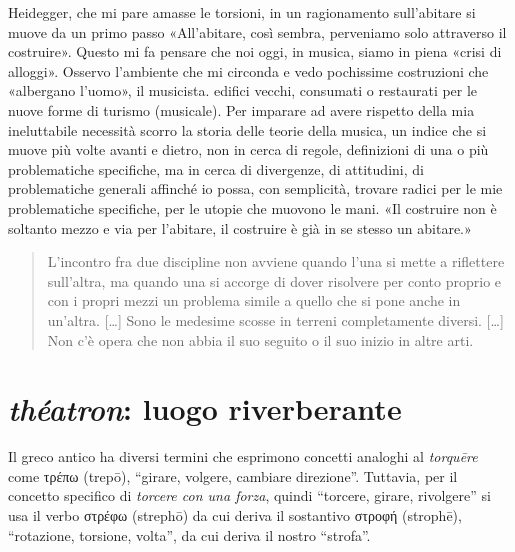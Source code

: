 \documentclass{../../lib/gs}
\begin{document}
Heidegger, che mi pare amasse le torsioni, in un ragionamento sull'abitare
\cite{heidegger1991} si muove da un primo passo «All'abitare, così sembra,
perveniamo solo attraverso il costruire». Questo mi fa pensare che noi oggi, in
musica, siamo in piena «crisi di alloggi». Osservo l'ambiente che mi circonda e
vedo pochissime costruzioni che «albergano l'uomo», il musicista. edifici vecchi,
consumati o restaurati per le nuove forme di turismo (musicale). Per imparare
ad avere rispetto della mia ineluttabile necessità scorro la storia delle teorie
della musica, un indice che si muove più volte avanti e dietro, non in cerca di
regole, definizioni di una o più problematiche specifiche, ma in cerca di
divergenze, di attitudini, di problematiche generali affinché io possa, con
semplicità, trovare radici per le mie problematiche specifiche, per le utopie
che muovono le mani. «Il costruire non è soltanto mezzo e via per l'abitare, il
costruire è già in se stesso un abitare.» \cite{heidegger1991}

\begin{quote}
\begin{sf}
\small
  L'incontro fra due discipline non avviene quando l'una si mette a riflettere sull'altra, ma quando una si accorge di dover risolvere per conto proprio e
  con i propri mezzi un problema simile a quello che si pone anche in un'altra.
  [\ldots] Sono le medesime scosse in terreni completamente diversi.
  [\ldots] Non c'è opera che non abbia il suo seguito o il suo inizio in altre
  arti.
  \cite{deleuze2009}
  \end{sf}
\end{quote}

%

\clearpage


\section{\emph{théatron}: luogo riverberante}

Il greco antico ha diversi termini che esprimono concetti analoghi al
\textit{torquēre} come \textgreek{τρέπω} (trepō), “girare, volgere, cambiare
direzione”. Tuttavia, per il concetto specifico di \emph{torcere con una forza},
quindi “torcere, girare, rivolgere” si usa il verbo \textgreek{στρέφω}
(strephō) da cui deriva il sostantivo \textgreek{στροφή} (strophē), “rotazione,
torsione, volta”, da cui deriva il nostro “strofa”.
\end{document}
